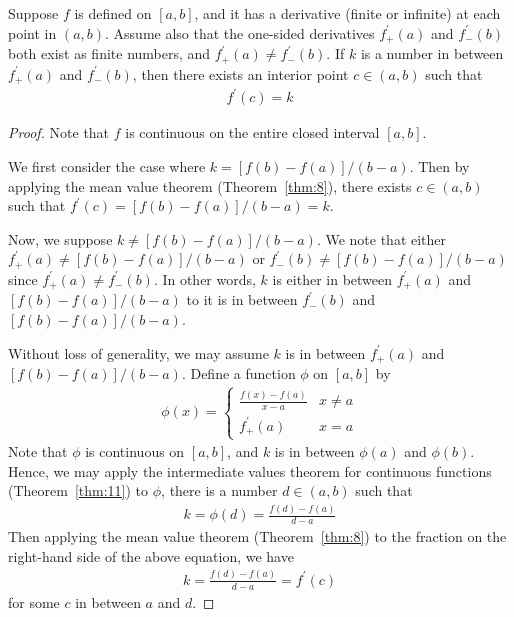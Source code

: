 \documentclass[thmcnt=section, 12pt]{my-elegantbook}
\begin{document}
\begin{theorem}[Darboux] \label{thm:12}
    Suppose $f$ is defined on $[a, b]$, and it has a derivative (finite or infinite) at each point in $(a, b)$. Assume also that the one-sided derivatives $f^\prime_{+}(a)$ and $f^\prime_{-}(b)$ both exist as finite numbers, and $f^\prime_{+}(a) \neq f^\prime_{-}(b)$. If $k$ is a number in between $f^\prime_{+}(a)$ and $f^\prime_{-}(b)$, then there exists an interior point $c \in (a, b)$ such that
    \begin{align*}
        f^\prime(c) = k
    \end{align*}
\end{theorem}

\begin{proof}
    Note that $f$ is continuous on the entire closed interval $[a, b]$.

    \par We first consider the case where $k = [f(b) - f(a)] / (b-a)$. Then by applying the mean value theorem (Theorem~\ref{thm:8}), there exists $c \in (a, b)$ such that $f^\prime(c) = [f(b) - f(a)] / (b-a) = k$.

    \par Now, we suppose $k \neq [f(b) - f(a)] / (b-a)$. We note that either $f^\prime_{+}(a) \neq [f(b) - f(a)] / (b-a)$ or $f^\prime_{-}(b) \neq [f(b) - f(a)] / (b-a)$ since $f^\prime_{+}(a) \neq f^\prime_{-}(b)$. In other words, $k$ is either in between $f^\prime_{+}(a)$ and $[f(b) - f(a)] / (b-a)$ to it is in between $f^\prime_{-}(b)$ and $[f(b) - f(a)] / (b-a)$.

    \par Without loss of generality, we may assume $k$ is in between $f^\prime_{+}(a)$ and $[f(b) - f(a)] / (b-a)$. Define a function $\phi$ on $[a, b]$ by
    \begin{align*}
        \phi(x) = \begin{cases}
                      \frac{f(x) - f(a)}{x - a}
                       & x \neq a \\
                      f^\prime_{+}(a)
                       & x = a
                  \end{cases}
    \end{align*}
    Note that $\phi$ is continuous on $[a, b]$, and $k$ is in between $\phi(a)$ and $\phi(b)$. Hence, we may apply the intermediate values theorem for continuous functions (Theorem~\ref{thm:11}) to $\phi$, there is a number $d \in (a, b)$ such that
    \begin{align*}
        k = \phi(d) = \frac{f(d) - f(a)}{d - a}
    \end{align*}
    Then applying the mean value theorem (Theorem~\ref{thm:8}) to the fraction on the right-hand side of the above equation, we have
    \begin{align*}
        k = \frac{f(d) - f(a)}{d - a}
        = f^\prime(c)
    \end{align*}
    for some $c$ in between $a$ and $d$.


\end{proof}
\end{document}
